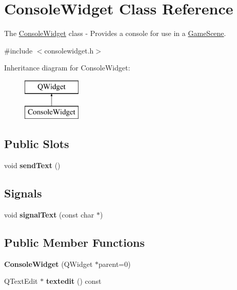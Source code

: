 \hypertarget{class_console_widget}{}\section{Console\+Widget Class Reference}
\label{class_console_widget}


The \hyperlink{class_console_widget}{Console\+Widget} class -\/ Provides a console for use in a \hyperlink{class_game_scene}{Game\+Scene}.  




{\ttfamily \#include $<$consolewidget.\+h$>$}

Inheritance diagram for Console\+Widget\+:\begin{figure}[H]
\begin{center}
\leavevmode
\includegraphics[height=2.000000cm]{class_console_widget}
\end{center}
\end{figure}
\subsection*{Public Slots}
\begin{DoxyCompactItemize}
\item 
\mbox{\label{class_console_widget_a25c9db0a82f572647288b738f1b1781d}} 
void {\bfseries send\+Text} ()
\end{DoxyCompactItemize}
\subsection*{Signals}
\begin{DoxyCompactItemize}
\item 
\mbox{\label{class_console_widget_a5ff85011eea230aefe8633b329d5132f}} 
void {\bfseries signal\+Text} (const char $\ast$)
\end{DoxyCompactItemize}
\subsection*{Public Member Functions}
\begin{DoxyCompactItemize}
\item 
\mbox{\label{class_console_widget_a4a66caaf3f7583a46ebe44a5c2221160}} 
{\bfseries Console\+Widget} (Q\+Widget $\ast$parent=0)
\item 
\mbox{\label{class_console_widget_a599f0a9577aa0f63e3aad3714de14925}} 
Q\+Text\+Edit $\ast$ {\bfseries textedit} () const
\end{DoxyCompactItemize}
